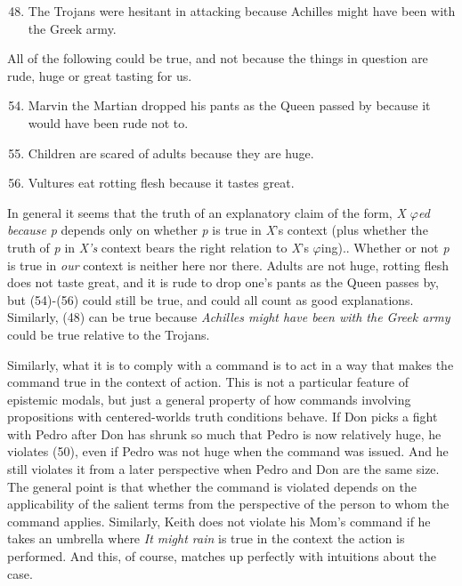 \begin{enumerate}
\setcounter{enumi}{47} 
\item The Trojans were hesitant in attacking because Achilles might have been with the Greek army.
\end{enumerate}

\noindent All of the following could be true, and not because the things in question are rude, huge or great tasting for us.
 
\begin{enumerate}
\setcounter{enumi}{53} 
\item Marvin the Martian dropped his pants as the Queen passed by because it would have been rude not to. 
\item Children are scared of adults because they are huge.
\item Vultures eat rotting flesh because it tastes great.
\end{enumerate}

\noindent In general it seems that the truth of an explanatory claim of the form, \textit{X $\varphi $ed because }\textit{p} depends only on whether \textit{p} is true in \textit{X}'s context (plus whether the truth of \textit{p} in \textit{X's} context bears the right relation to \textit{X}'s $\varphi $ing).. Whether or not \textit{p }is true in \textit{our }context is neither here nor there. Adults are not huge, rotting flesh does not taste great, and it is rude to drop one's pants as the Queen passes by, but (54)-(56) could still be true, and could all count as good explanations. Similarly, (48) can be true because \textit{Achilles might have been with the Greek army} could be true relative to the Trojans.
 
Similarly, what it is to comply with a command is to act in a way that makes the command true in the context of action. This is not a particular feature of epistemic modals, but just a general property of how commands involving propositions with centered-worlds truth conditions behave. If Don picks a fight with Pedro after Don has shrunk so much that Pedro is now relatively huge, he violates (50), even if Pedro was not huge when the command was issued. And he still violates it from a later perspective when Pedro and Don are the same size. The general point is that whether the command is violated depends on the applicability of the salient terms from the perspective of the person to whom the command applies. Similarly, Keith does not violate his Mom's command if he takes an umbrella where \textit{It might rain} is true in the context the action is performed. And this, of course, matches up perfectly with intuitions about the case.
 
